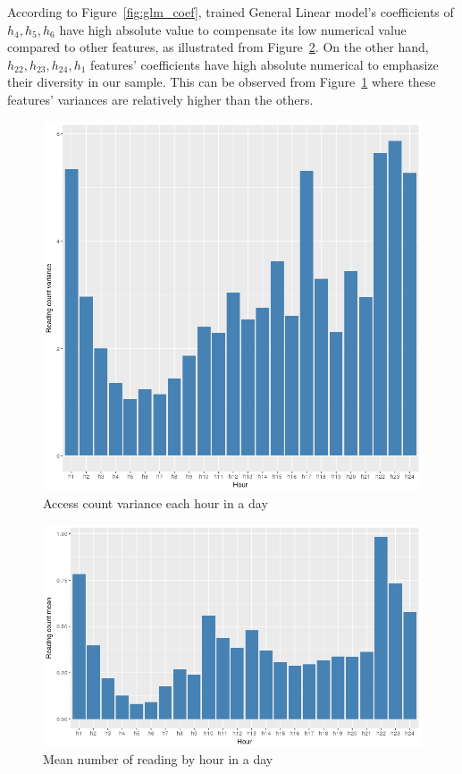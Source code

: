 \documentclass[English]{dicomopapers}
\begin{document}
 According to Figure~\ref{fig:glm_coef}, trained General Linear model's coefficients of \(h_4, h_5, h_6\) have high absolute value to compensate its low numerical value compared to other features, as illustrated from Figure~\ref{fig:access_mean}. On the other hand, \(h_{22}, h_{23}, h_{24}, h_1\) features' coefficients have high absolute numerical to emphasize their diversity in our sample. This can be observed from Figure~\ref{fig:access_var} where these features' variances are relatively higher than the others.\newline

\begin{figure}[ht]
  \centering
  \includegraphics[width=\textwidth/3,natwidth=827,natheight=805]{access_var.png}
  \caption{Access count variance each hour in a day}\label{fig:access_var}
\end{figure}
\begin{figure}[ht]
  \centering
  \includegraphics[width=\textwidth/3,natwidth=827,natheight=484]{access_mean.png}
  \caption{Mean number of reading by hour in a day}\label{fig:access_mean}
\end{figure}
\end{document}
